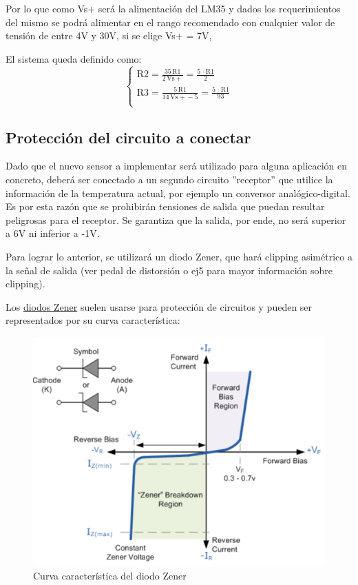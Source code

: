 \documentclass[../../main.tex]{subfiles}
\begin{document}
\begin{itemize}
 	
 	Por lo que como Vs+ será la alimentación del LM35 y dados los requerimientos del mismo se podrá alimentar en el rango recomendado con cualquier valor de tensión de entre 4V y 30V, si se elige Vs+ = 7V, \par

 El sistema queda definido como:
 		 \begin{equation}
  	   \left\{
	  	    \begin{array}{ll}
		 					\mathrm{R2} = \frac{35\, \mathrm{R1}}{2\, \mathrm{Vs+}} = \frac{5\, \cdot\mathrm{R1}}{2}\\
			 				\mathrm{R3} = \frac{5\, \mathrm{R1}}{14\, \mathrm{Vs+} - 5} = \frac{5\, \cdot\mathrm{R1}}{93}\\
	     	 \end{array}
	     	\right.
 	\end{equation}

\end{itemize}
\subsection{Protección del circuito a conectar}
\label{Protect}
Dado que el nuevo sensor a implementar será utilizado para alguna aplicación en concreto, deberá ser conectado a un segundo circuito ''receptor'' que utilice la información de la temperatura actual, por ejemplo un conversor analógico-digital. Es por esta razón que se prohibirán tensiones de salida que puedan resultar peligrosas para el receptor. Se garantiza que la salida, por ende, no será superior a 6V ni inferior a -1V. \par
Para lograr lo anterior, se utilizará un diodo Zener, que hará clipping asimétrico a la señal de salida (ver pedal de distorsión o ej5 para mayor información sobre clipping).\par
Los \underline{diodos Zener} suelen usarse para protección de circuitos y pueden ser representados por su curva característica:

\begin{figure}[H]	%
	\centering
	\includegraphics[scale=0.5]{imagenes/zener_diode_curva.png}
	\caption{Curva característica del diodo Zener}
	\label{fig:ej6_zener_diode_curva}
\end{figure}
\end{document}
